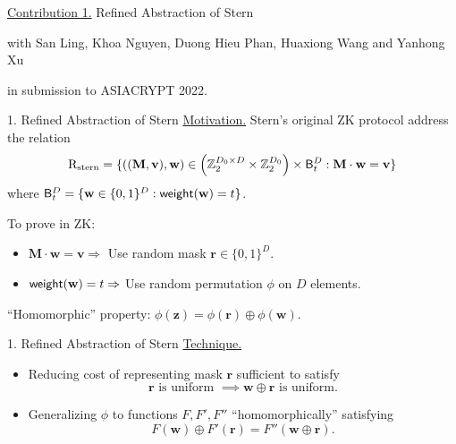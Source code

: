\begin{frame}{}
	\underline{Contribution 1.} Refined Abstraction of Stern
	
	{\small with San Ling, Khoa Nguyen, Duong Hieu Phan, Huaxiong Wang and Yanhong Xu}
	
	in submission to ASIACRYPT 2022.
\end{frame}

\begin{frame}{1. Refined Abstraction of Stern}
	\underline{Motivation.} Stern's original ZK protocol address the relation 
	\begin{equation*}
		\mathrm{R}_{\mathrm{stern}} = \{((\mathbf{M},\mathbf{v}), \mathbf{w}) \in \left(\mathbb{Z}_2^{D_0\times D}\times \mathbb{Z}_2^{D_0}\right)\times \mathsf{B}^D_t : \mathbf{M}\cdot\mathbf{w} = \mathbf{v}\}
	\end{equation*}
	where $\mathsf{B}^D_t = \{\mathbf{w} \in \{0,1\}^D : \mathsf{weight}(\mathbf{w}) = t\}$.
	
	To prove in ZK:
	\begin{itemize}
			\item $\mathbf{M}\cdot\mathbf{w} =\mathbf{v} \Rightarrow$ Use random mask $\mathbf{r} \in \{0,1\}^D$.
			\item $\mathsf{weight}(\mathbf{w}) = t \Rightarrow$ Use random permutation $\phi$ on $D$ elements.
	\end{itemize}
	
	``Homomorphic'' property: $\phi(\mathbf{z}) = \phi(\mathbf{r}) \oplus \phi(\mathbf{w})$.
\end{frame}

\begin{frame}{1. Refined Abstraction of Stern}
	\underline{Technique.}
	\begin{itemize}
		\item Reducing cost of representing mask $\mathbf{r}$ sufficient to satisfy 
		\begin{equation*}
			\mathbf{r} \text{ is uniform } \implies \mathbf{w} \oplus \mathbf{r} \text{ is uniform.}
		\end{equation*}  
		\item Generalizing $\phi$ to functions $F, F', F''$ ``homomorphically'' satisfying
		\begin{equation*}
			F(\mathbf{w}) \oplus F'(\mathbf{r}) = F''(\mathbf{w} \oplus \mathbf{r}).
		\end{equation*}
	\end{itemize}
\end{frame}
